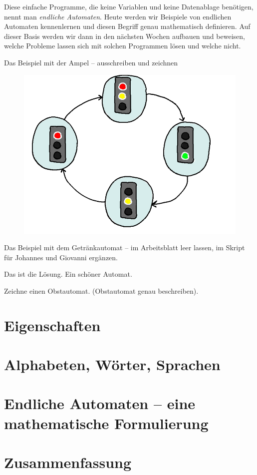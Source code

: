 \documentclass{article}
\begin{document}
Diese einfache Programme, die keine Variablen und keine Datenablage benötigen, nennt man \emph{endliche Automaten}. Heute werden wir Beispiele von endlichen Automaten kennenlernen und diesen Begriff genau mathematisch definieren. Auf dieser Basis werden wir dann in den nächsten Wochen aufbauen und beweisen, welche Probleme lassen sich mit solchen Programmen lösen und welche nicht.
\begin{example}
Das Beispiel mit der Ampel -- ausschreiben und zeichnen
\begin{figure}[H]
\centering
\includegraphics[width=\linewidth]{Pictures/Ampel.png} 
\end{figure}
\end{example}

\begin{example}
Das Beispiel mit dem Getränkautomat -- im Arbeitsblatt leer lassen, im Skript für Johannes und Giovanni ergänzen.
\end{example}

\begin{examplesolution}[print=true]
Das ist die Lösung. Ein schöner Automat.
\end{examplesolution}

\begin{question}
Zeichne einen Obstautomat. (Obstautomat genau beschreiben).
\end{question}

\section{Eigenschaften}
\section{Alphabeten, Wörter, Sprachen}

\section{Endliche Automaten -- eine mathematische Formulierung}
\section{Zusammenfassung}
\end{document}
